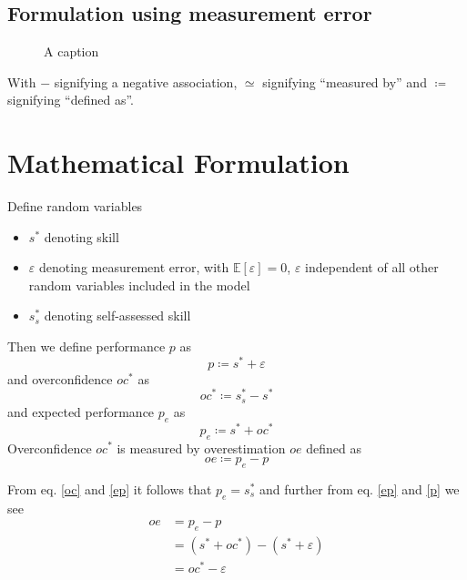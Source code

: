 \documentclass[a4paper,11pt]{article}
\renewcommand*{\epsilon}{\varepsilon}%
\newcommand{\1}{\mathbf{1}}
\newcommand{\Exp}{\mathbb{E}}
\begin{document}
\subsection{Formulation using measurement error}

\begin{figure}[H]
  \vspace{1cm}
  \begin{center}
  
  \end{center}
  \caption{A caption}
  \label{fig:typetree}
\end{figure}


With $-$ signifying a negative association, $\simeq$ signifying ``measured by'' and $\coloneq$ signifying ``defined as''.

\section{Mathematical Formulation}
Define random variables
\begin{itemize}
 \item $s^*$ denoting skill
 \item $\epsilon$ denoting measurement error, with $\Exp[\epsilon] = 0$, $\epsilon$ independent of all other random variables included in the model
 \item $s^*_s$ denoting self-assessed skill
\end{itemize}

\noindent Then we define performance $p$ as
\begin{equation} \label{p}
  p \coloneq s^* + \epsilon
\end{equation}
and overconfidence $oc^*$ as
\begin{equation} \label{oc}
  oc^* \coloneq s^*_s-s^*
\end{equation}
and expected performance $p_e$ as
\begin{equation} \label{ep}
  p_e \coloneq s^* + oc^*
\end{equation}
Overconfidence $oc^*$ is measured by overestimation $oe$ defined as
\begin{equation}
  oe \coloneq p_e - p
\end{equation}

\noindent From eq. \ref{oc} and \ref{ep} it follows that $p_e = s^*_s$ and further from eq. \ref{ep} and \ref{p} we see
\begin{align} \label{dd}
  oe &= p_e - p \\
  &= (s^* + oc^*) - (s^* + \epsilon) \\
  &= oc^* - \epsilon
\end{align}
\end{document}

